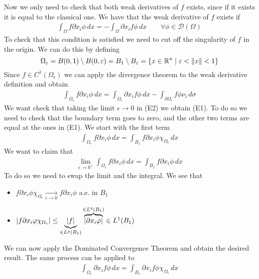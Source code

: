 Now we only need to check that both weak derivatives of \(f\) exists, since if it exists it is equal to the classical one. We have that the weak derivative of \(f\) exists if
\[
    \begin{split}
        \int_\Omega f \partial x_i \phi \, dx = - \int_\Omega \partial x_i f \phi \, dx \qquad \forall \phi \in \mathcal{D}(\Omega)
    \end{split}
    \tag*{E1}
\]
To check that this condition is satisfied we need to cut off the singularity of \(f\) in the origin. We can do this by defining
\[
    \Omega_\varepsilon = B(0, 1) \setminus B(0, \varepsilon) = B_1 \setminus B_\varepsilon = \left\{ x \in \mathbb{R}^n \mid \varepsilon < \norm{x} < 1 \right\}
\]
Since \(f \in C^1(\Omega_\epsilon)\) we can apply the divergence theorem to the weak derivative definition and obtain
\[
    \begin{split}
        \int_{\Omega_\epsilon} f \partial x_i \phi \, dx = \int_{\Omega_\epsilon} \partial x_i f \phi \, dx - \int_{\partial\Omega_\epsilon} f \phi \nu_i \, d\sigma
    \end{split}
    \tag*{E2}
\]
We want check that taking the limit \(\epsilon \to 0\) in (E2) we obtain (E1). To do so we need to check that the boundary term goes to zero, and the other two terms are equal at the ones in (E1). We start with the first term
\[
    \begin{split}
        \int_{\Omega_\epsilon} f \partial x_i \phi \, dx = \int_{B_1} f \partial x_i \phi \chi_{\Omega_\epsilon} \, dx
    \end{split}
\]
We want to claim that 
\[
    \begin{split}
        \lim_{\epsilon \to 0^+} \int_{\Omega_\epsilon} f \partial x_i \phi \, dx = \int_{B_1} f \partial x_i \phi \, dx
    \end{split}
\]
To do so we need to swap the limit and the integral. We see that 
\begin{itemize}
    \item \(f \partial x_i \phi \chi_{\Omega_\epsilon} \underset{\epsilon \to 0}{\longrightarrow} f \partial x_i \phi\) a.e. in \(B_1\)
    \item \(\abs{f \partial x_i \varphi \chi_{\Omega_\varepsilon}} \leq \underbrace{\abs{f}}_{\in L^p(B_1)} \overbrace{\abs{\partial x_i \varphi}}^{\in L^q(B_1)} \in L^1(B_1)\)
\end{itemize}
We can now apply the Dominated Convergence Theorem and obtain the desired result. 
The same process can be applied to
\[
    \begin{split}
        \int_{\Omega_\epsilon} \partial x_i f \phi \, dx = \int_{B_1} \partial x_i f \phi \chi_{\Omega_\epsilon} \, dx
    \end{split}
\]
